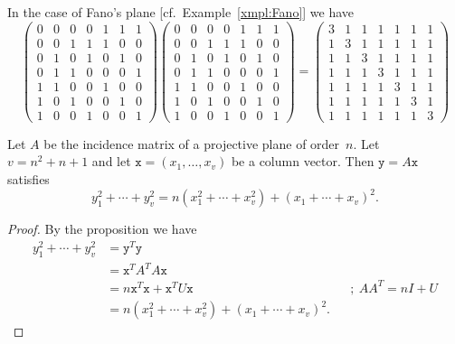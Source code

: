 \begin{test}\label{test:Fano}
    In the case of Fano's plane [cf.~Example~\ref{xmpl:Fano}] we have
    \[
        \begin{pmatrix}
        0 & 0 & 0 & 0 & 1 & 1 & 1 \\
        0 & 0 & 1 & 1 & 1 & 0 & 0 \\
        0 & 1 & 0 & 1 & 0 & 1 & 0 \\
        0 & 1 & 1 & 0 & 0 & 0 & 1 \\
        1 & 1 & 0 & 0 & 1 & 0 & 0 \\
        1 & 0 & 1 & 0 & 0 & 1 & 0 \\
        1 & 0 & 0 & 1 & 0 & 0 & 1
        \end{pmatrix}
        \begin{pmatrix}
        0 & 0 & 0 & 0 & 1 & 1 & 1 \\
        0 & 0 & 1 & 1 & 1 & 0 & 0 \\
        0 & 1 & 0 & 1 & 0 & 1 & 0 \\
        0 & 1 & 1 & 0 & 0 & 0 & 1 \\
        1 & 1 & 0 & 0 & 1 & 0 & 0 \\
        1 & 0 & 1 & 0 & 0 & 1 & 0 \\
        1 & 0 & 0 & 1 & 0 & 0 & 1
        \end{pmatrix}
        =
        \begin{pmatrix}
        3 & 1 & 1 & 1 & 1 & 1 & 1 \\
        1 & 3 & 1 & 1 & 1 & 1 & 1 \\
        1 & 1 & 3 & 1 & 1 & 1 & 1 \\
        1 & 1 & 1 & 3 & 1 & 1 & 1 \\
        1 & 1 & 1 & 1 & 3 & 1 & 1 \\
        1 & 1 & 1 & 1 & 1 & 3 & 1 \\
        1 & 1 & 1 & 1 & 1 & 1 & 3
        \end{pmatrix}
    \]
\end{test}

\begin{cor}\label{cor:incidence-squared-sums}
    Let\/ $A$ be the incidence matrix of a projective plane of order\/~$n$. Let\/ $v=n^2+n+1$ and let\/ $\mathtt x=(x_1,\dots,x_v)$ be a column vector. Then\/ $\mathtt y=A\mathtt x$ satisfies
    $$
        y_1^2+\cdots+y_v^2 = n(x_1^2+\cdots+x_v^2)
            + (x_1+\cdots+x_v)^2.
    $$
\end{cor}

\begin{proof}
    By the proposition we have
    \begin{align*}
        y_1^2+\cdots+y_v^2 &= \mathtt y^T\mathtt y\\
            &= \mathtt x^TA^T\!A\mathtt x\\
            &= n\mathtt x^T\mathtt x+\mathtt x^TU\mathtt x
                &&;\ AA^T=nI+U\\
            &= n(x_1^2+\cdots+x_v^2)+(x_1+\cdots+x_v)^2.
    \end{align*}
\end{proof}

